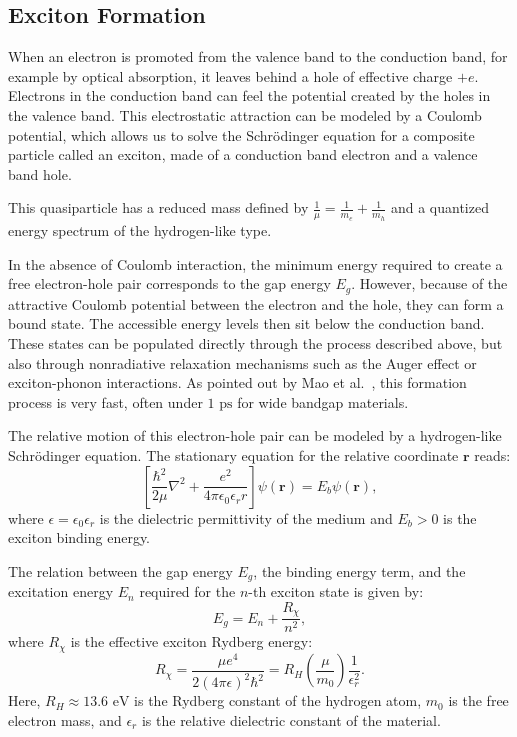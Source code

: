 \subsection{Exciton Formation}

When an electron is promoted from the valence band to the conduction band, for example by optical absorption, it leaves behind a hole of effective charge $+e$. Electrons in the conduction band can feel the potential created by the holes in the valence band. This electrostatic attraction can be modeled by a Coulomb potential, which allows us to solve the Schrödinger equation for a composite particle called an exciton, made of a conduction band electron and a valence band hole.

This quasiparticle has a reduced mass defined by $\frac{1}{\mu} = \frac{1}{m_e} + \frac{1}{m_h}$ and a quantized energy spectrum of the hydrogen-like type.

In the absence of Coulomb interaction, the minimum energy required to create a free electron-hole pair corresponds to the gap energy $E_g$. However, because of the attractive Coulomb potential between the electron and the hole, they can form a bound state. The accessible energy levels then sit below the conduction band. These states can be populated directly through the process described above, but also through nonradiative relaxation mechanisms such as the Auger effect or exciton-phonon interactions. As pointed out by Mao et al.~\cite{mao2004}, this formation process is very fast, often under $1 \text{ ps}$ for wide bandgap materials.

The relative motion of this electron-hole pair can be modeled by a hydrogen-like Schrödinger equation. The stationary equation for the relative coordinate $\mathbf{r}$ reads:
\begin{equation}
    \left[ \frac{\hbar^2}{2\mu} \nabla^2 + \frac{e^2}{4\pi \epsilon_0 \epsilon_r r} \right] \psi(\mathbf{r}) = E_b \psi(\mathbf{r}),
\end{equation}
where $\epsilon = \epsilon_0 \epsilon_r$ is the dielectric permittivity of the medium and $E_b > 0$ is the exciton binding energy.

The relation between the gap energy $E_g$, the binding energy term, and the excitation energy $E_n$ required for the $n$-th exciton state is given by:
\begin{equation}
    E_g = E_n + \frac{R_\chi}{n^2},
\end{equation}
where $R_\chi$ is the effective exciton Rydberg energy:
\begin{equation}
    R_\chi = \frac{\mu e^4}{2(4\pi \epsilon)^2 \hbar^2} = R_H \left(\frac{\mu}{m_0}\right) \frac{1}{\epsilon_r^2}.
\end{equation}
Here, $R_H \approx 13.6\text{ eV}$ is the Rydberg constant of the hydrogen atom, $m_0$ is the free electron mass, and $\epsilon_r$ is the relative dielectric constant of the material.

